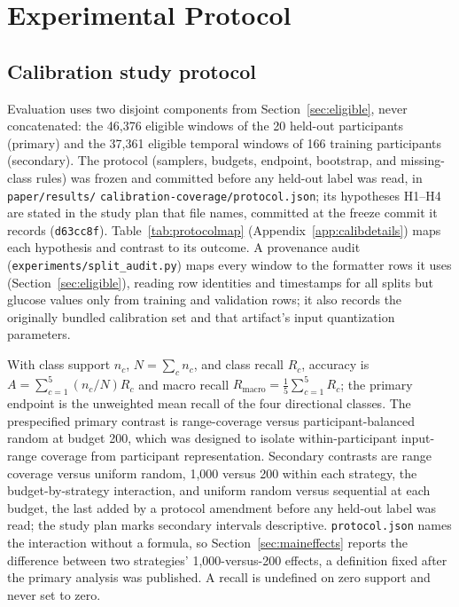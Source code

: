 \documentclass[10pt,twocolumn]{article}
\begin{document}
\section{Experimental Protocol}

\subsection{Calibration study protocol}
\label{sec:calibprotocol}

Evaluation uses two disjoint components from Section~\ref{sec:eligible},
never concatenated: the 46,376 eligible windows of the 20 held-out
participants (primary) and the 37,361 eligible temporal windows of 166
training participants (secondary). The protocol (samplers, budgets,
endpoint, bootstrap, and missing-class rules) was frozen and committed
before any held-out label was read, in \texttt{paper/results/}
\texttt{calibration-coverage/protocol.json}; its hypotheses H1--H4 are
stated in the study plan that file names, committed at the freeze commit
it records (\texttt{d63cc8f}). Table~\ref{tab:protocolmap}
(Appendix~\ref{app:calibdetails}) maps each hypothesis and contrast to its
outcome. A provenance audit (\texttt{experiments/split\_audit.py}) maps
every window to the formatter rows it uses (Section~\ref{sec:eligible}),
reading row identities and timestamps for all splits but glucose values
only from training and validation rows; it also records the originally
bundled calibration set and that artifact's input quantization parameters.

With class support $n_c$, $N=\sum_c n_c$, and class recall $R_c$, accuracy
is $A=\sum_{c=1}^{5}(n_c/N)R_c$ and macro recall
$R_{\mathrm{macro}}=\frac{1}{5}\sum_{c=1}^{5}R_c$; the primary endpoint is
the unweighted mean recall of the four directional classes. The
prespecified primary contrast is range-coverage versus participant-balanced
random at budget 200, which was designed to isolate within-participant
input-range coverage from participant representation. Secondary contrasts are range
coverage versus uniform random, 1,000 versus 200 within each strategy, the
budget-by-strategy interaction, and uniform random versus sequential at
each budget, the last added by a protocol amendment before any held-out
label was read; the study plan marks secondary intervals descriptive.
\texttt{protocol.json} names the interaction without a formula, so
Section~\ref{sec:maineffects} reports the difference between two
strategies' 1,000-versus-200 effects, a definition fixed after the primary
analysis was published. A recall is undefined on zero support and never
set to zero.
\end{document}
